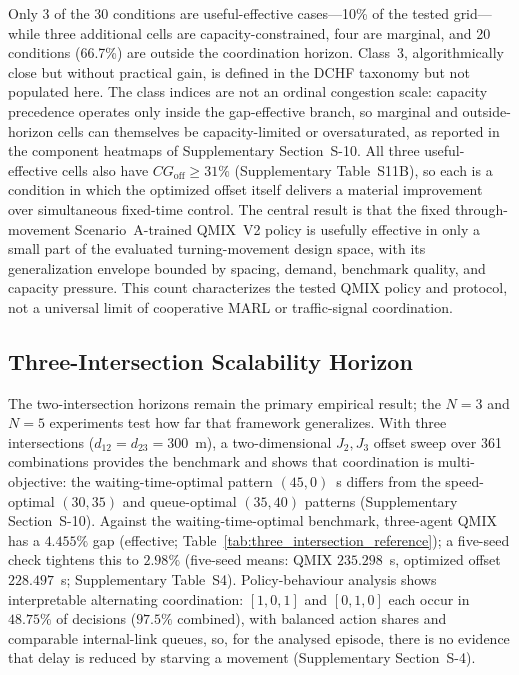 \documentclass[review,12pt]{elsarticle}
\begin{document}
Only 3 of the 30 conditions are useful-effective cases---10\% of the tested grid---while three additional cells are capacity-constrained, four are marginal, and 20 conditions (66.7\%) are outside the coordination horizon. Class~3, algorithmically close but without practical gain, is defined in the DCHF taxonomy but not populated here. The class indices are not an ordinal congestion scale: capacity precedence operates only inside the gap-effective branch, so marginal and outside-horizon cells can themselves be capacity-limited or oversaturated, as reported in the component heatmaps of Supplementary Section~S-10. All three useful-effective cells also have $CG_{\mathrm{off}}\geq31\%$ (Supplementary Table~S11B), so each is a condition in which the optimized offset itself delivers a material improvement over simultaneous fixed-time control. The central result is that the fixed through-movement Scenario~A-trained QMIX~V2 policy is usefully effective in only a small part of the evaluated turning-movement design space, with its generalization envelope bounded by spacing, demand, benchmark quality, and capacity pressure. This count characterizes the tested QMIX policy and protocol, not a universal limit of cooperative MARL or traffic-signal coordination.

\subsection{Three-Intersection Scalability Horizon}
\label{subsec:scalability}

The two-intersection horizons remain the primary empirical result; the $N=3$ and $N=5$ experiments test how far that framework generalizes. With three intersections ($d_{12}=d_{23}=300$~m), a two-dimensional $J_2,J_3$ offset sweep over 361 combinations provides the benchmark and shows that coordination is multi-objective: the waiting-time-optimal pattern $(45,0)$~s differs from the speed-optimal $(30,35)$ and queue-optimal $(35,40)$ patterns (Supplementary Section~S-10). Against the waiting-time-optimal benchmark, three-agent QMIX has a $4.455\%$ gap (effective; Table~\ref{tab:three_intersection_reference}); a five-seed check tightens this to $2.98\%$ (five-seed means: QMIX $235.298$~s, optimized offset $228.497$~s; Supplementary Table~S4). Policy-behaviour analysis shows interpretable alternating coordination: $[1,0,1]$ and $[0,1,0]$ each occur in $48.75\%$ of decisions ($97.5\%$ combined), with balanced action shares and comparable internal-link queues, so, for the analysed episode, there is no evidence that delay is reduced by starving a movement (Supplementary Section~S-4).
\end{document}
